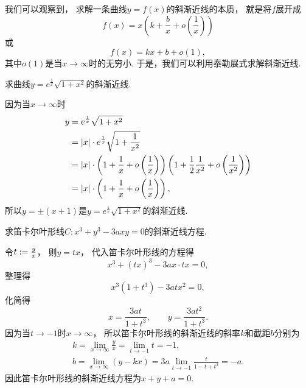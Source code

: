 我们可以观察到，
求解一条曲线\(y = f(x)\)的斜渐近线的本质，
就是将\(f\)展开成\[
	f(x) = x \left( k + \frac{b}{x} + o\left(\frac1x\right) \right)
\]或\[
	f(x) = k x + b + o(1),
\]
其中\(o(1)\)是当\(x\to\infty\)时的无穷小.
于是，我们可以利用泰勒展式求解斜渐近线.

\begin{example}
求曲线\(y = e^{\frac1x} \sqrt{1+x^2}\)的斜渐近线.
\begin{solution}
因为当\(x\to\infty\)时\begin{align*}
	y &= e^{\frac1x} \sqrt{1+x^2} \\
	&= \abs{x} \cdot e^{\frac1x} \sqrt{1+\frac1{x^2}} \\
	&= \abs{x} \cdot \left( 1 + \frac1x + o\left(\frac1x\right) \right)
	\left( 1 + \frac12 \frac1{x^2} + o\left(\frac1{x^2}\right) \right) \\
	&= \abs{x} \cdot \left( 1 + \frac1x + o\left(\frac1x\right) \right),
\end{align*}
所以\(y = \pm(x + 1)\)是\(y = e^{\frac1x} \sqrt{1+x^2}\)的斜渐近线.
\end{solution}
\end{example}

\begin{example}
求笛卡尔叶形线\(C: x^3+y^3-3axy=0\)的斜渐近线方程.
\begin{solution}
令\(t := \frac{y}{x}\)，
则\(y = tx\)，
代入笛卡尔叶形线的方程得\[
	x^3+(tx)^3-3ax \cdot tx = 0,
\]
整理得\[
	x^3(1+t^3)-3atx^2=0,
\]
化简得\[
	x = \frac{3at}{1+t^3},
	\qquad
	y = \frac{3at^2}{1+t^3}.
\]
因为当\(t\to-1\)时\(x\to\infty\)，
所以笛卡尔叶形线的斜渐近线的斜率\(k\)和截距\(b\)分别为\begin{gather*}
	k = \lim_{x\to\infty} \frac{y}{x}
	= \lim_{t\to-1} t
	= -1, \\
	b = \lim_{x\to\infty} (y-kx)
	= 3a \lim_{t\to-1} \frac{t}{1-t+t^2}
	= -a.
\end{gather*}
因此笛卡尔叶形线的斜渐近线方程为\(x+y+a=0\).
\end{solution}
\end{example}

